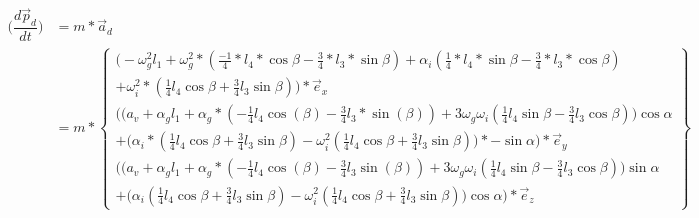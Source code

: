 \documentclass[a4paper,10pt]{article}
\begin{document}
\begin{equation}
\begin{aligned}
	\big(\dfrac{d\vec{p}_d}{dt}\big) &= m *\vec{a}_d\\
	&= m * \begin{Bmatrix}
	\Big( -\omega^{2}_g l_1 +\omega_{g}^{2} * (\frac{-1}{4}*l_4*\cos{\beta}-\frac{3}{4}*l_3*\sin{\beta})+\alpha_i(\frac{1}{4}*l_4 *\sin{\beta}-\frac{3}{4}*l_3 * \cos{\beta})\\ + \omega_i^2*(\frac{1}{4} l_4 \cos{\beta} + \frac{3}{4} l_3  \sin{\beta}) \Big)* \vec{e}_{x}\\
	\Bigg(\Big(a_v +\alpha_g l_1 +\alpha_g *({-\frac{1}{4}}  l_4 \cos(\beta)-\frac{3}{4}l_3*\sin(\beta)) + 3\omega_g\omega_i(\frac{1}{4}l_4 \sin{\beta}-\frac{3}{4}l_3  \cos{\beta})\Big)\cos{\alpha}\\ + \Big(\alpha_i * (\frac{1}{4} l_4 \cos{\beta} + \frac{3}{4} l_3 \sin{\beta}) - \omega_i^2(\frac{1}{4} l_4 \cos{\beta} + \frac{3}{4} l_3  \sin{\beta})\Big)*-\sin{\alpha}\Bigg)*\vec{e}_{y}\\
	\Bigg(\Big(a_v +\alpha_g l_1 +\alpha_g *({-\frac{1}{4}}  l_4 \cos(\beta)-\frac{3}{4}l_3 \sin(\beta)) + 3\omega_g\omega_i(\frac{1}{4}l_4 \sin{\beta}-\frac{3}{4}l_3  \cos{\beta})\Big)\sin{\alpha}\\ + \Big(\alpha_i (\frac{1}{4} l_4 \cos{\beta} + \frac{3}{4} l_3 \sin{\beta}) - \omega_i^2(\frac{1}{4} l_4 \cos{\beta} + \frac{3}{4} l_3  \sin{\beta})\Big) \cos{\alpha}\Bigg)*\vec{e}_{z}
	\end{Bmatrix}
\end{aligned}
\end{equation}
\end{document}
